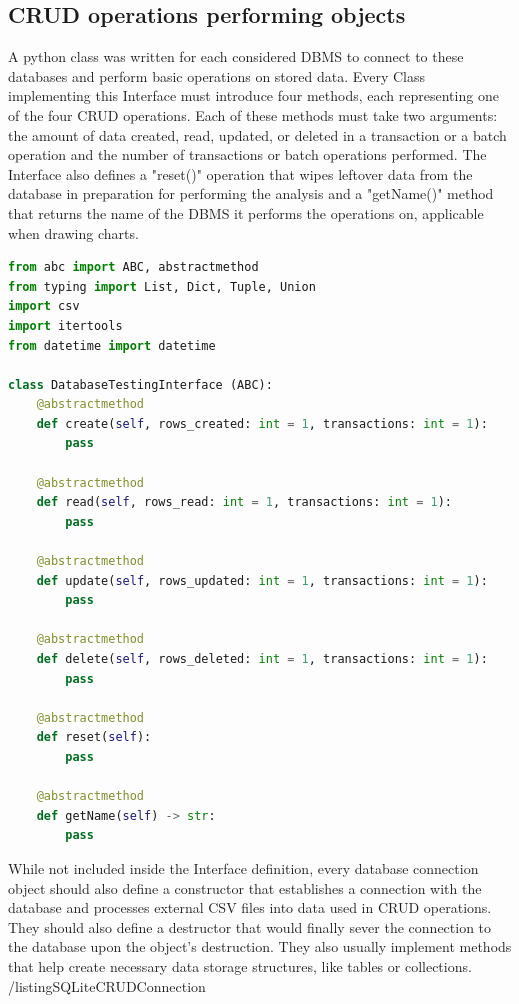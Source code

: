 \subsection{CRUD operations performing objects}
\par A python class was written for each considered DBMS to connect to these databases and perform basic operations on stored data. Every Class implementing this Interface must introduce four methods, each representing one of the four CRUD operations. Each of these methods must take two arguments: the amount of data created, read, updated, or deleted in a transaction or a batch operation and the number of transactions or batch operations performed. The Interface also defines a "reset()" operation that wipes leftover data from the database in preparation for performing the analysis and a "getName()" method that returns the name of the DBMS it performs the operations on, applicable when drawing charts.
\begin{lstlisting}[language=Python, caption=DatabaseTestingInterface]
from abc import ABC, abstractmethod
from typing import List, Dict, Tuple, Union
import csv
import itertools
from datetime import datetime

class DatabaseTestingInterface (ABC):
    @abstractmethod
    def create(self, rows_created: int = 1, transactions: int = 1):
        pass

    @abstractmethod
    def read(self, rows_read: int = 1, transactions: int = 1):
        pass

    @abstractmethod
    def update(self, rows_updated: int = 1, transactions: int = 1):
        pass

    @abstractmethod
    def delete(self, rows_deleted: int = 1, transactions: int = 1):
        pass

    @abstractmethod
    def reset(self):
        pass

    @abstractmethod
    def getName(self) -> str:
        pass
\end{lstlisting}
\par While not included inside the Interface definition, every database connection object should also define a constructor that establishes a connection with the database and processes external CSV files into data used in CRUD operations. They should also define a destructor that would finally sever the connection to the database upon the object's destruction. They also usually implement methods that help create necessary data storage structures, like tables or collections.
/listing{SQLiteCRUDConnection}
